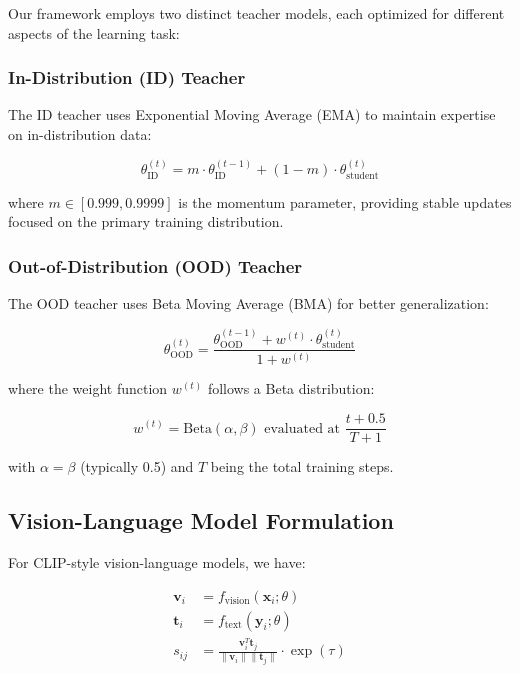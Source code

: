 \documentclass[11pt,a4paper]{article}
\begin{document}
Our framework employs two distinct teacher models, each optimized for different aspects of the learning task:

\subsubsection{In-Distribution (ID) Teacher}
The ID teacher uses Exponential Moving Average (EMA) to maintain expertise on in-distribution data:

\begin{equation}
\theta_{\text{ID}}^{(t)} = m \cdot \theta_{\text{ID}}^{(t-1)} + (1-m) \cdot \theta_{\text{student}}^{(t)}
\end{equation}

where $m \in [0.999, 0.9999]$ is the momentum parameter, providing stable updates focused on the primary training distribution.

\subsubsection{Out-of-Distribution (OOD) Teacher}
The OOD teacher uses Beta Moving Average (BMA) for better generalization:

\begin{equation}
\theta_{\text{OOD}}^{(t)} = \frac{\theta_{\text{OOD}}^{(t-1)} + w^{(t)} \cdot \theta_{\text{student}}^{(t)}}{1 + w^{(t)}}
\end{equation}

where the weight function $w^{(t)}$ follows a Beta distribution:

\begin{equation}
w^{(t)} = \text{Beta}(\alpha, \beta) \text{ evaluated at } \frac{t + 0.5}{T + 1}
\end{equation}

with $\alpha = \beta$ (typically 0.5) and $T$ being the total training steps.

\subsection{Vision-Language Model Formulation}

For CLIP-style vision-language models, we have:

\begin{align}
\mathbf{v}_i &= f_{\text{vision}}(\mathbf{x}_i; \theta) \\
\mathbf{t}_i &= f_{\text{text}}(\mathbf{y}_i; \theta) \\
s_{ij} &= \frac{\mathbf{v}_i^T \mathbf{t}_j}{\|\mathbf{v}_i\| \|\mathbf{t}_j\|} \cdot \exp(\tau)
\end{align}
\end{document}
